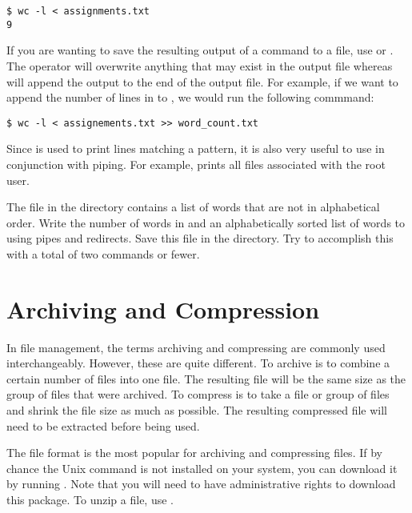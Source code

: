 \begin{lstlisting}
$ wc -l < assignments.txt
9
\end{lstlisting}

If you are wanting to save the resulting output of a command to a file, use \li{>} or \li{>>}.
The \li{>} operator will overwrite anything that may exist in the output file whereas \li{>>} will append the output to the end of the output file.
For example, if we want to append the number of lines in  to , we would run the following commmand:

\begin{lstlisting}
$ wc -l < assignements.txt >> word_count.txt
\end{lstlisting}

Since  is used to print lines matching a pattern, it is also very useful to use in conjunction with piping.
For example,  prints all files associated with the root user.

\begin{problem}
The  file in the  directory contains a list of words that are not in alphabetical order.
Write the number of words in  and an alphabetically sorted list of words to  using pipes and redirects.
Save this file in the  directory.
Try to accomplish this with a total of two commands or fewer.
\end{problem}

\section*{Archiving and Compression}
In file management, the terms archiving and compressing are commonly used interchangeably.
However, these are quite different.
To archive is to combine a certain number of files into one file.
The resulting file will be the same size as the group of files that were archived.
To compress is to take a file or group of files and shrink the file size as much as possible.
The resulting compressed file will need to be extracted before being used.

The  file format is the most popular for archiving and compressing files.
If by chance the  Unix command is not installed on your system, you can download it by running .
Note that you will need to have administrative rights to download this package.
To unzip a file, use . 

